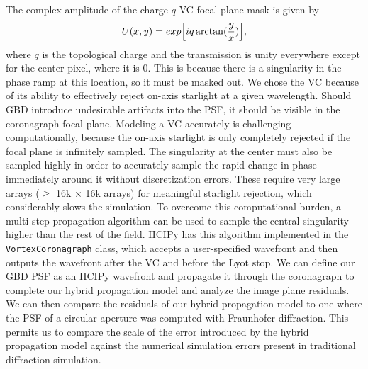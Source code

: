 The complex amplitude of the charge-$q$ VC focal plane mask is given by
\begin{equation}
	U(x,y) = exp\Bigl[i q \arctan(\frac{y}{x})\Bigr],
	\label{eq:vortex}
\end{equation}
where $q$ is the topological charge and the transmission is unity everywhere except for the center pixel, where it is 0. This is because there is a singularity in the phase ramp at this location, so it must be masked out. We chose the VC because of its ability to effectively reject on-axis starlight at a given wavelength. Should GBD introduce undesirable artifacts into the PSF, it should be visible in the coronagraph focal plane. Modeling a VC accurately is challenging computationally, because the on-axis starlight is only completely rejected if the focal plane is infinitely sampled. The singularity at the center must also be sampled highly in order to accurately sample the rapid change in phase immediately around it without discretization errors. These require very large arrays ($\ge$ 16k $\times$ 16k arrays) for meaningful starlight rejection, which considerably slows the simulation. To overcome this computational burden, a multi-step propagation algorithm can be used to sample the central singularity higher than the rest of the field. HCIPy\cite{por2018hcipy} has this algorithm implemented in the \verb"VortexCoronagraph" class, which accepts a user-specified wavefront and then outputs the wavefront after the VC and before the Lyot stop. We can define our GBD PSF as an HCIPy wavefront and propagate it through the coronagraph to complete our hybrid propagation model and analyze the image plane residuals. We can then compare the residuals of our hybrid propagation model to one where the PSF of a circular aperture was computed with Fraunhofer diffraction. This permits us to compare the scale of the error introduced by the hybrid propagation model against the numerical simulation errors present in traditional diffraction simulation.

\label{sect:results}  %

